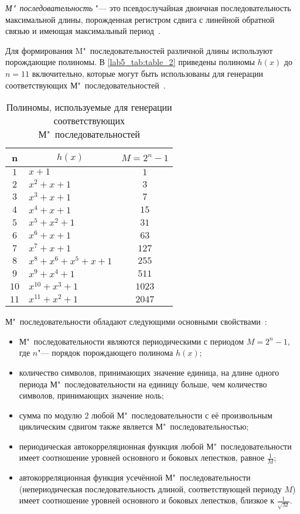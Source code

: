 \emph{М"~последовательность} "--- это псевдослучайная двоичная последовательность максимальной длины, порожденная регистром сдвига с линейной обратной связью и имеющая максимальный период~\cite{Varakin}. 
	
Для формирования M"~последовательностей различной длины используют порождающие полиномы. В \autoref{lab5_tab:table_2} приведены полиномы $h(x)$ до $n=11$ включительно, которые могут быть использованы для генерации соответствующих М"~последовательностей~\cite{Mak}.

   	\begin{table}[H]
   	\caption{Полиномы, используемые для генерации соответствующих М"~последовательностей} 
	\label{lab5_tab:table_2}
		\begin{tabular}{|c|p{5.1cm}|c|}
			\hline
			\multicolumn{1}{|c|}{n} & \multicolumn{1}{c|}{$h(x)$} & \multicolumn{1}{c|}{$M=2^n-1$} \\ \hline
			$1$ & $x+1$ & $1$ \\ \hline
			$2$ & $x^2+x+1$ & $3$ \\ \hline
			$3$ & $x^3+x+1$ & $7$ \\ \hline
			$4$ & $x^4+x+1$ & $15$ \\ \hline
			$5$ & $x^5+x^2+1$ & $31$ \\ \hline
			$6$ & $x^6+x+1$ & $63$ \\ \hline
			$7$ & $x^7+x+1$ & $127$ \\ \hline
			$8$ & $x^8+x^6+x^5+x+1$ & $255$ \\ \hline
			$9$ & $x^9+x^4+1$ & $511$ \\ \hline
			$10$ & $x^{10}+x^3+1$ &  $1023$ \\ \hline
			$11$ & $x^{11}+x^2+1$ & $2047$ \\ \hline
		\end{tabular}
\end{table}
	
М"~последовательности обладают следующими основными свойствами~\cite{Golomb}:	
\renewcommand{\labelitemi}{--}
\begin{itemize}
    \item М"~последовательности являются периодическими с периодом $M=2^n-1$, где $n$"--- порядок порождающего полинома $h(x)$;
    \item количество символов, принимающих значение единица, на длине одного периода М"~последовательности на единицу больше, чем количество символов, принимающих значение ноль;
    \item сумма по модулю $2$ любой М"~последовательности с её произвольным циклическим сдвигом также является М"~последовательностью;
    \item периодическая автокорреляционная функция любой М"~последовательности имеет соотношение уровней основного и боковых лепестков, равное $\displaystyle\frac{1}{M}$;
    \item автокорреляционная функция усечённой М"~последовательности (непериодическая последовательность длиной, соответствующей периоду $M$) имеет соотношение уровней основного и боковых лепестков, близкое к $\displaystyle\frac{1}{\sqrt{M}}$.
\end{itemize}
\vspace{10mm}